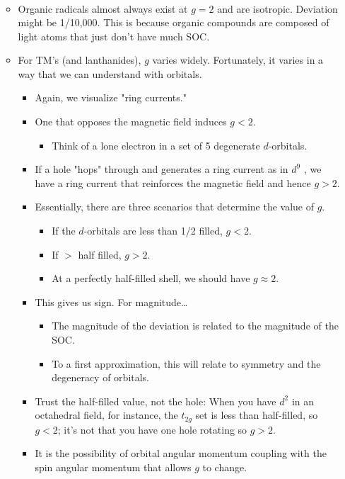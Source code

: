\documentclass[../notes.tex]{subfiles}
\begin{document}
\begin{itemize}
\begin{itemize}
\begin{align*}
        \end{align*}
        \item Organic radicals almost always exist at $g=2$ and are isotropic. Deviation might be 1/10,000. This is because organic compounds are composed of light atoms that just don't have much SOC.
        \item For TM's (and lanthanides), $g$ varies widely. Fortunately, it varies in a way that we can understand with orbitals.
        \begin{itemize}
            \item Again, we visualize "ring currents."
            \item One that opposes the magnetic field induces $g<2$.
            \begin{itemize}
                \item Think of a lone electron in a set of 5 degenerate $d$-orbitals.
            \end{itemize}
            \item If a hole "hops" through and generates a ring current as in $d^9$ , we have a ring current that reinforces the magnetic field and hence $g>2$.
            \item Essentially, there are three scenarios that determine the value of $g$.
            \begin{itemize}
                \item If the $d$-orbitals are less than 1/2 filled, $g<2$.
                \item If $>$ half filled, $g>2$.
                \item At a perfectly half-filled shell, we should have $g\approx 2$.
            \end{itemize}
            \item This gives us sign. For magnitude\dots
            \begin{itemize}
                \item The magnitude of the deviation is related to the magnitude of the SOC.
                \item To a first approximation, this will relate to symmetry and the degeneracy of orbitals.
            \end{itemize}
            \item Trust the half-filled value, not the hole: When you have $d^2$ in an octahedral field, for instance, the $t_{2g}$ set is less than half-filled, so $g<2$; it's not that you have one hole rotating so $g>2$.
            \item It is the possibility of orbital angular momentum coupling with the spin angular momentum that allows $g$ to change.

\end{itemize}
\end{itemize}
\end{itemize}
\end{document}
